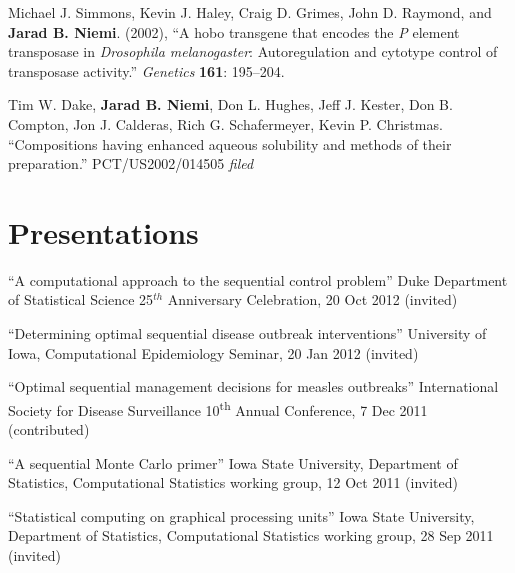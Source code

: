 \documentclass[overlapped,line,letterpaper]{res}
\begin{document}
\begin{resume}
Michael J. Simmons, Kevin J. Haley, Craig D. Grimes, John D. Raymond, and {\bf Jarad B. Niemi}. (2002), ``A hobo transgene that encodes the \emph{P} element transposase in \emph{Drosophila melanogaster}: Autoregulation and cytotype control of transposase activity.'' \emph{Genetics} {\bf 161}: 195--204.



Tim W. Dake, {\bf Jarad B. Niemi}, Don L. Hughes, Jeff J. Kester, Don B. Compton, Jon J. Calderas, Rich G. Schafermeyer, Kevin P. Christmas. ``Compositions having enhanced aqueous solubility and methods of their preparation.'' PCT/US2002/014505 \emph{filed}




\section{\bf Presentations}

%

{\small

``A computational approach to the sequential control problem'' Duke Department of Statistical Science 25$^{th}$ Anniversary Celebration, 20 Oct 2012 (invited)

``Determining optimal sequential disease outbreak interventions'' University of Iowa, Computational Epidemiology Seminar, 20 Jan 2012 (invited)

``Optimal sequential management decisions for measles outbreaks'' International Society for Disease Surveillance 10\textsuperscript{th} Annual Conference, 7 Dec 2011 (contributed)

``A sequential Monte Carlo primer'' Iowa State University, Department of Statistics, Computational Statistics working group, 12 Oct 2011 (invited)

``Statistical computing on graphical processing units'' Iowa State University, Department of Statistics, Computational Statistics working group, 28 Sep 2011 (invited)

}
\end{resume}
\end{document}
